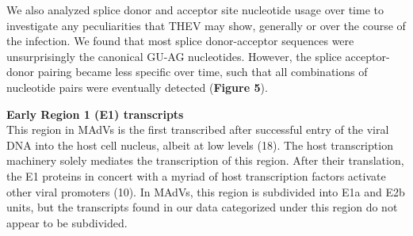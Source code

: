\documentclass[
]{article}
\begin{document}
We also analyzed splice donor and acceptor site nucleotide usage over
time to investigate any peculiarities that THEV may show, generally or
over the course of the infection. We found that most splice
donor-acceptor sequences were unsurprisingly the canonical GU-AG
nucleotides. However, the splice acceptor-donor pairing became less
specific over time, such that all combinations of nucleotide pairs were
eventually detected (\textbf{Figure 5}).

\textbf{Early Region 1 (E1) transcripts}\\
This region in MAdVs is the first transcribed after successful entry of
the viral DNA into the host cell nucleus, albeit at low levels (18). The
host transcription machinery solely mediates the transcription of this
region. After their translation, the E1 proteins in concert with a
myriad of host transcription factors activate other viral promoters
(10). In MAdVs, this region is subdivided into E1a and E2b units, but
the transcripts found in our data categorized under this region do not
appear to be subdivided.
\end{document}
